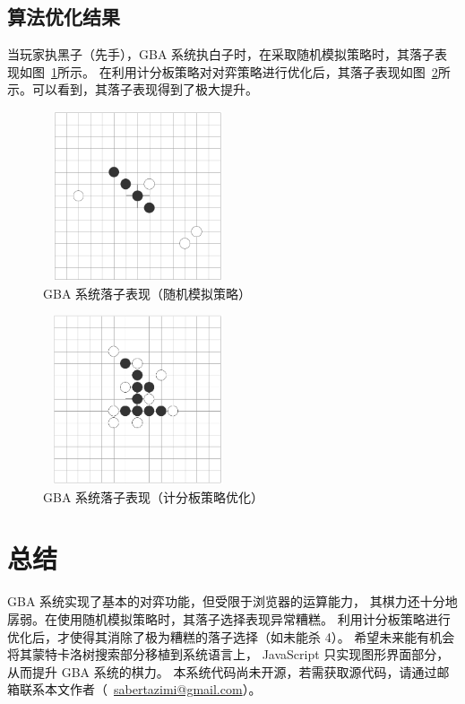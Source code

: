 \documentclass[UTF8,cs4size]{ctexart}
\begin{document}
\subsection{算法优化结果}
当玩家执黑子（先手），GBA 系统执白子时，在采取随机模拟策略时，其落子表现如图~\ref{fig:mcts_gba_v1}所示。
在利用计分板策略对对弈策略进行优化后，其落子表现如图~\ref{fig:mcts_gba_v2}所示。可以看到，其落子表现得到了极大提升。

\begin{figure}[htb]
  \centering
  \includegraphics[width=0.5\textwidth,height=5cm]{figures/final_gba_v1.png}
  \caption{GBA 系统落子表现（随机模拟策略）}
  \label{fig:mcts_gba_v1}
\end{figure}

\begin{figure}[htb]
  \centering
  \includegraphics[width=0.5\textwidth,height=5cm]{figures/final_gba_v2.png}
  \caption{GBA 系统落子表现（计分板策略优化）}
  \label{fig:mcts_gba_v2}
\end{figure}

\clearpage

\section{总结}
GBA 系统实现了基本的对弈功能，但受限于浏览器的运算能力，
其棋力还十分地孱弱。在使用随机模拟策略时，其落子选择表现异常糟糕。
利用计分板策略进行优化后，才使得其消除了极为糟糕的落子选择（如未能杀 4）。
希望未来能有机会将其蒙特卡洛树搜索部分移植到系统语言上，
JavaScript 只实现图形界面部分，从而提升 GBA 系统的棋力。
本系统代码尚未开源，若需获取源代码，请通过邮箱联系本文作者（~\href{mailto:sabertazimi@gmail.com}{sabertazimi@gmail.com}）。
\newpage



\newpage
\end{document}
